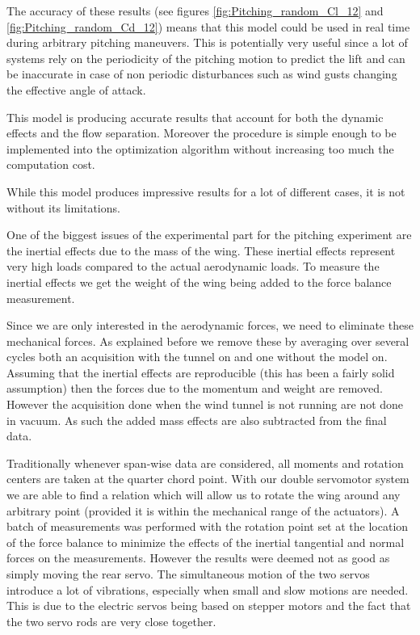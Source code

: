 \par The accuracy of these results (see figures \ref{fig:Pitching_random_Cl_12} and \ref{fig:Pitching_random_Cd_12}) means that this model could be used in real time during arbitrary pitching maneuvers.
This is potentially very useful since a lot of systems rely on the periodicity of the pitching motion to predict the lift and can be inaccurate in case of non periodic disturbances such as wind gusts changing the effective angle of attack.

\par This model is producing accurate results that account for both the dynamic effects and the flow separation.
Moreover the procedure is simple enough to be implemented into the optimization algorithm without increasing too much the computation cost.

\FloatBarrier


While this model produces impressive results for a lot of different cases, it is not without its limitations.

 \label{subs:added_mass}
One of the biggest issues of the experimental part for the pitching experiment are the inertial effects due to the mass of the wing.
These inertial effects represent very high loads compared to the actual aerodynamic loads.
To measure the inertial effects we get the weight of the wing being added to the force balance measurement.

\par Since we are only interested in the aerodynamic forces, we need to eliminate these mechanical forces.
As explained before we remove these by averaging over several cycles both an acquisition with the tunnel on and one without the model on.
Assuming that the inertial effects are reproducible (this has been a fairly solid assumption) then the forces due to the momentum and weight are removed.
However the acquisition done when the wind tunnel is not running are not done in vacuum.
As such the added mass effects are also subtracted from the final data.

Traditionally whenever span-wise data are considered, all moments and rotation centers are taken at the quarter chord point.
With our double servomotor system we are able to find a relation which will allow us to rotate the wing around any arbitrary point (provided it is within the mechanical range of the actuators).
A batch of measurements was performed with the rotation point set at the location of the force balance to minimize the effects of the inertial tangential and normal forces on the measurements.
However the results were deemed not as good as simply moving the rear servo.
The simultaneous motion of the two servos introduce a lot of vibrations, especially when small and slow motions are needed.
This is due to the electric servos being based on stepper motors and the fact that the two servo rods are very close together.

